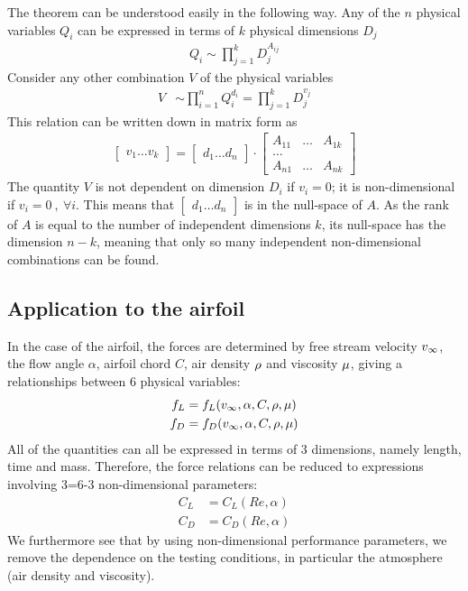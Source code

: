 The theorem can be understood easily in the following way. Any of the
$n$ physical variables $Q_i$ can be expressed in terms of $k$ physical
dimensions $D_j$
\begin{align*}
  Q_i \sim \prod_{j=1}^k D_j^{A_{ij}}
\end{align*}
Consider any other combination $V$ of the physical variables
\begin{align*}
  V &\sim \prod_{i=1}^n Q_i^{d_i} = \prod_{j=1}^k D_j^{v_j} 
\end{align*}
This relation can be written down in matrix form as
\begin{align*}
  \begin{bmatrix} v_1 \ldots v_k \end{bmatrix} = 
  \begin{bmatrix} d_1 \ldots d_n \end{bmatrix} \cdot 
  \begin{bmatrix} A_{11} & \ldots & A_{1k} \\ \ldots \\ A_{n1} & \ldots & A_{nk} \end{bmatrix}
\end{align*}
The quantity $V$ is not dependent on dimension $D_i$ if $v_i=0$; it is
non-dimensional if $v_i=0~,~\forall i$. This means that
$\begin{bmatrix} d_1 \ldots d_n \end{bmatrix}$ is in the null-space of
$A$. As the rank of $A$ is equal to the number of independent
dimensions $k$, its null-space has the dimension $n-k$, meaning that
only so many independent non-dimensional combinations can be found.

\subsection{Application to the airfoil}

In the case of the airfoil, the forces are determined by free stream
velocity $v_\infty$, the flow angle $\alpha$, airfoil chord $C$,
air density $\rho$ and viscosity $\mu$, giving a relationships
between 6 physical variables:
\begin{align*}
  f_L &= f_L(v_\infty,\alpha,C,\rho,\mu) \\
  f_D &= f_D(v_\infty,\alpha,C,\rho,\mu)
\end{align*}
All of the quantities can all be expressed in terms of 3 dimensions,
namely length, time and mass. Therefore, the force relations can be
reduced to expressions involving 3=6-3 non-dimensional parameters:
\begin{align*}
  C_L &= C_L(Re,\alpha) \\
  C_D &= C_D(Re,\alpha) 
\end{align*}
We furthermore see that by using non-dimensional performance
parameters, we remove the dependence on the testing conditions, in
particular the atmosphere (\ie air density and viscosity).


